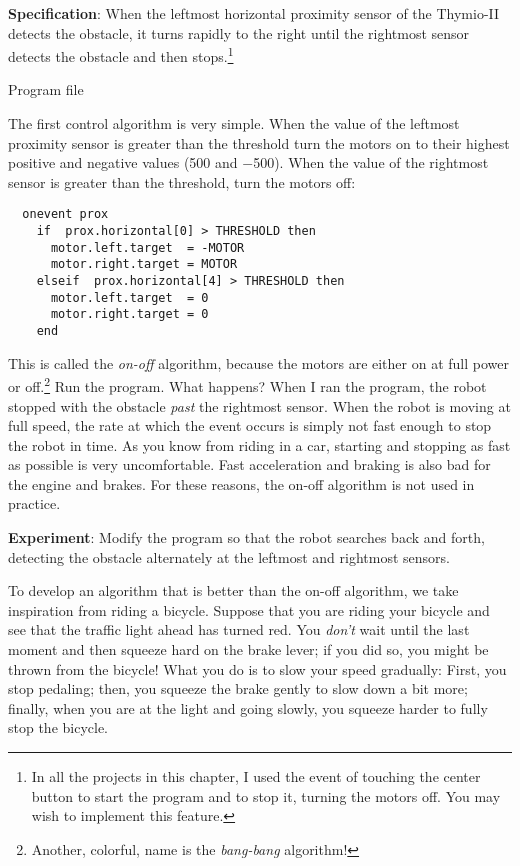 
\textbf{Specification}: When the leftmost horizontal proximity sensor of
the Thymio-II detects the obstacle, it turns rapidly to the right until
the rightmost sensor detects the obstacle and then stops.\footnote{In
all the projects in this chapter, I used the event of touching the
center button to start the program and to stop it, turning the motors
off. You may wish to implement this feature.}

{\raggedleft \hfill Program file }

The first control algorithm is very simple. When the value of the
leftmost proximity sensor is greater than the threshold turn the motors
on to their highest positive and negative values (500 and $-$500). When
the value of the rightmost sensor is greater than the threshold, turn
the motors off:

\begin{verbatim}
  onevent prox
    if  prox.horizontal[0] > THRESHOLD then
      motor.left.target  = -MOTOR 
      motor.right.target = MOTOR
    elseif  prox.horizontal[4] > THRESHOLD then
      motor.left.target  = 0
      motor.right.target = 0
    end
\end{verbatim}

This is called the \emph{on-off} algorithm, because the motors are
either on at full power or off.\footnote{Another, colorful, name is the
\emph{bang-bang} algorithm!} Run the program. What happens? When I ran
the program, the robot stopped with the obstacle \emph{past} the
rightmost sensor. When the robot is moving at full speed, the rate at
which the  event occurs is simply not fast enough to stop the
robot in time. As you know from riding in a car, starting and stopping
as fast as possible is very uncomfortable. Fast acceleration and braking
is also bad for the engine and brakes. For these reasons, the on-off
algorithm is not used in practice.

\textbf{Experiment}: Modify the program so that the robot searches back
and forth, detecting the obstacle alternately at the leftmost and
rightmost sensors.


To develop an algorithm that is better than the on-off algorithm, we
take inspiration from riding a bicycle. Suppose that you are riding your
bicycle and see that the traffic light ahead has turned red. You
\emph{don't} wait until the last moment and then squeeze hard on the
brake lever; if you did so, you might be thrown from the bicycle! What
you do is to slow your speed gradually: First, you stop pedaling; then,
you squeeze the brake gently to slow down a bit more; finally, when you
are at the light and going slowly, you squeeze harder to fully stop the
bicycle.

